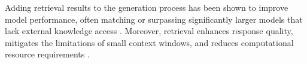 Adding retrieval results to the generation process has been shown to improve model performance, often matching or surpassing significantly larger models that lack external knowledge access \cite{in-context}.
Moreover, retrieval enhances response quality, mitigates the limitations of small context windows, and reduces computational resource requirements \cite{Xu2023RetrievalML}.

